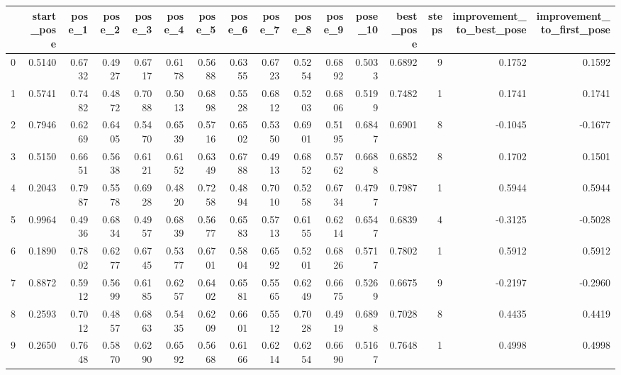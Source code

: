 \begin{tabular}{lrrrrrrrrrrrrrrr}
\toprule
{} &  start\_pose &  pose\_1 &  pose\_2 &  pose\_3 &  pose\_4 &  pose\_5 &  pose\_6 &  pose\_7 &  pose\_8 &  pose\_9 &  pose\_10 &  best\_pose &  steps &  improvement\_to\_best\_pose &  improvement\_to\_first\_pose \\
\midrule
0   &      0.5140 &  0.6732 &  0.4927 &  0.6717 &  0.6178 &  0.5688 &  0.6355 &  0.6723 &  0.5254 &  0.6892 &   0.5033 &     0.6892 &      9 &                    0.1752 &                     0.1592 \\
1   &      0.5741 &  0.7482 &  0.4872 &  0.7088 &  0.5013 &  0.6898 &  0.5528 &  0.6812 &  0.5203 &  0.6806 &   0.5199 &     0.7482 &      1 &                    0.1741 &                     0.1741 \\
2   &      0.7946 &  0.6269 &  0.6405 &  0.5470 &  0.6539 &  0.5716 &  0.6502 &  0.5350 &  0.6901 &  0.5195 &   0.6847 &     0.6901 &      8 &                   -0.1045 &                    -0.1677 \\
3   &      0.5150 &  0.6651 &  0.5638 &  0.6121 &  0.6152 &  0.6349 &  0.6788 &  0.4913 &  0.6852 &  0.5762 &   0.6688 &     0.6852 &      8 &                    0.1702 &                     0.1501 \\
4   &      0.2043 &  0.7987 &  0.5578 &  0.6928 &  0.4820 &  0.7258 &  0.4894 &  0.7010 &  0.5258 &  0.6734 &   0.4797 &     0.7987 &      1 &                    0.5944 &                     0.5944 \\
5   &      0.9964 &  0.4936 &  0.6834 &  0.4957 &  0.6839 &  0.5677 &  0.6583 &  0.5713 &  0.6155 &  0.6214 &   0.6547 &     0.6839 &      4 &                   -0.3125 &                    -0.5028 \\
6   &      0.1890 &  0.7802 &  0.6277 &  0.6745 &  0.5377 &  0.6701 &  0.5804 &  0.6592 &  0.5201 &  0.6826 &   0.5717 &     0.7802 &      1 &                    0.5912 &                     0.5912 \\
7   &      0.8872 &  0.5912 &  0.5699 &  0.6185 &  0.6257 &  0.6402 &  0.6581 &  0.5565 &  0.6249 &  0.6675 &   0.5269 &     0.6675 &      9 &                   -0.2197 &                    -0.2960 \\
8   &      0.2593 &  0.7012 &  0.4857 &  0.6863 &  0.5435 &  0.6209 &  0.6601 &  0.5512 &  0.7028 &  0.4919 &   0.6898 &     0.7028 &      8 &                    0.4435 &                     0.4419 \\
9   &      0.2650 &  0.7648 &  0.5870 &  0.6290 &  0.6592 &  0.5668 &  0.6166 &  0.6214 &  0.6254 &  0.6690 &   0.5167 &     0.7648 &      1 &                    0.4998 &                     0.4998 \\

\end{tabular}

